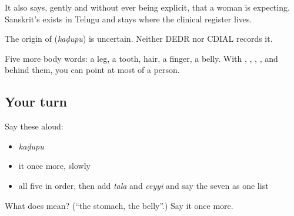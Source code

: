 It also says, gently and without ever being explicit, that a woman is expecting. Sanskrit's  exists in Telugu and stays where the clinical register lives.

\begin{cousinweb}
The origin of \textbf{} (\emph{kaḍupu}) is uncertain. Neither DEDR nor CDIAL records it.
\end{cousinweb}

\begin{grammarlens}[title={What you've built}]
Five more body words: a leg, a tooth, hair, a finger, a belly. With , , , ,  and  behind them, you can point at most of a person.
\end{grammarlens}

\subsection*{Your turn}
Say these aloud:

\begin{itemize}
\raggedright
  \item \emph{kaḍupu}
  \item it once more, slowly
  \item all five in order, then add \emph{tala} and \emph{ceyyi} and say the seven as one list
\end{itemize}

\begin{tcolorbox}[breakable,colback=teal!4,colframe=teal!35!black,title={Before you move on}]
What does  mean? (\textquotedblleft{}the stomach, the belly\textquotedblright{}.) Say it once more.
\end{tcolorbox}
